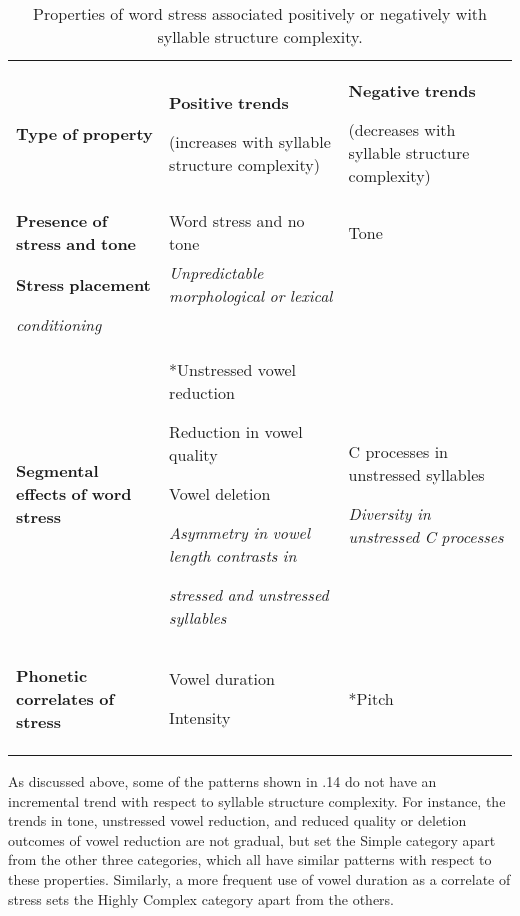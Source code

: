 \begin{table}
\begin{tabularx}{\textwidth}{XXX}
\lsptoprule

\textbf{Type} \textbf{of} \textbf{property} & \textbf{Positive} \textbf{trends}

(increases with syllable structure complexity) & \textbf{Negative} \textbf{trends}

(decreases with syllable structure complexity)\\
\textbf{Presence} \textbf{of} \textbf{stress} \textbf{and} \textbf{tone} & Word stress and no tone & Tone\\
\textbf{Stress} \textbf{placement} & \textit{Unpredictable} \textit{morphological} \textit{or} \textit{lexical}\\
     \textit{conditioning} & \\
\textbf{Segmental} \textbf{effects} \textbf{of} \textbf{word} \textbf{stress} & *Unstressed vowel reduction

Reduction in vowel quality

Vowel deletion

\textit{Asymmetry} \textit{in} \textit{vowel} \textit{length} \textit{contrasts} \textit{in} 

     \textit{stressed} \textit{and} \textit{unstressed} \textit{syllables} & C processes in unstressed syllables

\textit{Diversity} \textit{in} \textit{unstressed} \textit{C} \textit{processes}\\
\textbf{Phonetic} \textbf{correlates} \textbf{of} \textbf{stress} & Vowel duration

Intensity & *Pitch\\
\lspbottomrule
\end{tabularx}
\caption{\label{5.14}Properties of word stress associated positively or negatively with syllable structure complexity.}
\end{table}

  As discussed above, some of the patterns shown in .14 do not have an incremental trend with respect to syllable structure complexity. For instance, the trends in tone, unstressed vowel reduction, and reduced quality or deletion outcomes of vowel reduction are not gradual, but set the Simple category apart from the other three categories, which all have similar patterns with respect to these properties. Similarly, a more frequent use of vowel duration as a correlate of stress sets the Highly Complex category apart from the others.

